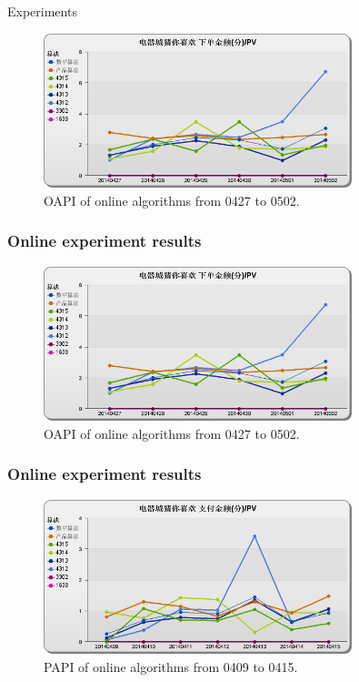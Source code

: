 \documentclass[xetex,mathserif,serif]{beamer}
\begin{document}
\begin{section}{Experiments}
\begin{frame}
\begin{figure}
\begin{center}
\includegraphics[width=0.8\textwidth]{fig/yixunexp/OAPI0427.png}
\caption{\label{fig:oapi0427} OAPI of online algorithms  from 0427 to 0502.}
\end{center}
\end{figure}
\end{frame}
\begin{frame}
  \frametitle{Online experiment results}
\begin{figure}
\begin{center}



\includegraphics[width=0.8\textwidth]{fig/yixunexp/OAPI0427.png}
\caption{\label{fig:oapi0427} OAPI of online algorithms  from 0427 to 0502.}
\end{center}
\end{figure}
\end{frame}

\begin{frame}
  \frametitle{Online experiment results}
\begin{figure}
\begin{center}

\includegraphics[width=0.8\textwidth]{fig/yixunexp/PAPI0415.png}
\caption{ PAPI of online algorithms  from 0409 to 0415.}
\end{center}
\end{figure}
\end{frame}
\end{section}
\end{document}
